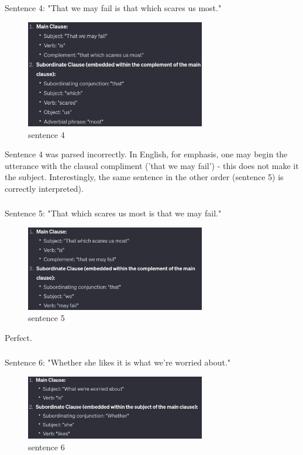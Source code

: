 \documentclass{article}
\begin{document}
\subsubsection{}	%
Sentence 4: "That we may fail is that which scares us most." \\
\begin{figure}[H]
  \centering
  \includegraphics[width=0.7\textwidth]{sen4.png} 
  \caption{sentence 4}
\end{figure}


Sentence 4 was parsed incorrectly. In English, for emphasis, one may begin the utterance with the clausal compliment ('that we may fail') - this does not make it the subject. Interestingly, the same sentence in the other order (sentence 5) is correctly interpreted). 
\\
\subsubsection{}	%
Sentence 5: "That which scares us most is that we may fail." \\
\begin{figure}[H]
  \centering
  \includegraphics[width=0.7\textwidth]{sen5.png} 
  \caption{sentence 5}
\end{figure}


Perfect. \\
\subsubsection{}	%
Sentence 6: "Whether she likes it is what we're worried about." \\
\begin{figure}[H]
  \centering
  \includegraphics[width=0.7\textwidth]{sen6.png} 
  \caption{sentence 6}
\end{figure}
\end{document}
